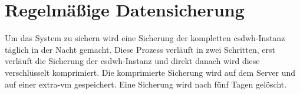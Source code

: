 \chapter{Regelmäßige Datensicherung} \label{ch:back}
  Um das System zu sichern wird eine Sicherung der kompletten \ac{csdwh}-Instanz täglich in der Nacht gemacht. Diese Prozess verläuft in zwei Schritten, erst verläuft die Sicherung der \ac{csdwh}-Instanz und direkt danach wird diese verschlüsselt komprimiert. Die komprimierte Sicherung wird auf dem Server und auf einer extra-\ac{vm} gespeichert. Eine Sicherung wird nach fünf Tagen gelöscht.
  